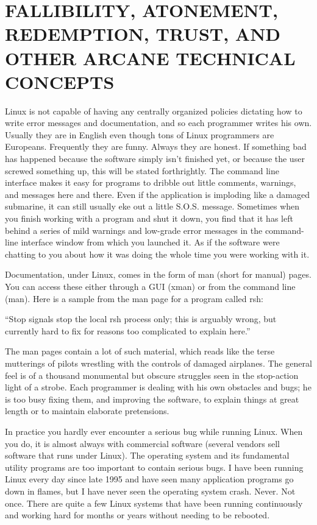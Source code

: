 \documentclass[
  fontsize=11pt,
  paper=landscape,
  twocolumn=true,
  pagesize=pdftex,
  headings=small,
  DIV=15,
  ]{scrartcl}
\begin{document}
\section{FALLIBILITY, ATONEMENT, REDEMPTION, TRUST, AND OTHER ARCANE
TECHNICAL CONCEPTS}

Linux is not capable of having any centrally organized policies
dictating how to write error messages and documentation, and so each
programmer writes his own. Usually they are in English even though tons
of Linux programmers are Europeans. Frequently they are funny. Always
they are honest. If something bad has happened because the software
simply isn't finished yet, or because the user screwed something up,
this will be stated forthrightly. The command line interface makes it
easy for programs to dribble out little comments, warnings, and messages
here and there. Even if the application is imploding like a damaged
submarine, it can still usually eke out a little S.O.S. message.
Sometimes when you finish working with a program and shut it down, you
find that it has left behind a series of mild warnings and low-grade
error messages in the command-line interface window from which you
launched it. As if the software were chatting to you about how it was
doing the whole time you were working with it.

Documentation, under Linux, comes in the form of man (short for manual)
pages. You can access these either through a GUI (xman) or from the
command line (man). Here is a sample from the man page for a program
called rsh:

``Stop signals stop the local rsh process only; this is arguably wrong,
but currently hard to fix for reasons too complicated to explain here.''

The man pages contain a lot of such material, which reads like the terse
mutterings of pilots wrestling with the controls of damaged airplanes.
The general feel is of a thousand monumental but obscure struggles seen
in the stop-action light of a strobe. Each programmer is dealing with
his own obstacles and bugs; he is too busy fixing them, and improving
the software, to explain things at great length or to maintain elaborate
pretensions.

In practice you hardly ever encounter a serious bug while running Linux.
When you do, it is almost always with commercial software (several
vendors sell software that runs under Linux). The operating system and
its fundamental utility programs are too important to contain serious
bugs. I have been running Linux every day since late 1995 and have seen
many application programs go down in flames, but I have never seen the
operating system crash. Never. Not once. There are quite a few Linux
systems that have been running continuously and working hard for months
or years without needing to be rebooted.
\end{document}
